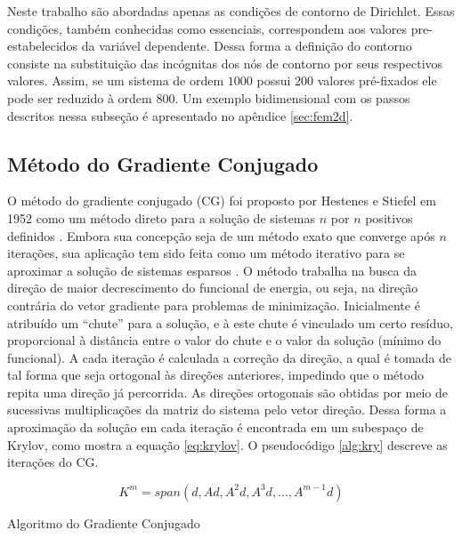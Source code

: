 \documentclass[
    12pt,               %
    openright,          %
    oneside,
    a4paper,            %
    english,            %
    french,             %
    spanish,            %
    brazil              %
    ]{abntex2}
\begin{document}
Neste trabalho são abordadas apenas as condições de contorno de Dirichlet. Essas condições, também conhecidas como essenciais, correspondem aos valores pre-estabelecidos da variável dependente. Dessa forma a definição do contorno consiste na substituição das incógnitas dos nós de contorno por seus respectivos valores. Assim, se um sistema de ordem $1000$ possui $200$ valores pré-fixados ele pode ser reduzido à ordem $800$. Um exemplo bidimensional com os passos descritos nessa subseção é apresentado no apêndice \ref{sec:fem2d}.

\subsection{Método do Gradiente Conjugado}
\label{sec:CG}
O método do gradiente conjugado (CG) foi proposto por Hestenes e Stiefel em 1952 como um método direto para a solução de sistemas $n$ por $n$ positivos definidos  \cite{burdenFaires}.
Embora sua concepção seja de um método exato que converge após $n$ iterações, sua aplicação tem sido feita como um método iterativo para se aproximar a solução de sistemas esparsos  \cite{Barrett1995}.
O método trabalha na busca da direção de maior decrescimento do funcional de energia, ou seja, na direção contrária do vetor gradiente para problemas de minimização. Inicialmente é atribuído um ``chute'' para a solução, e à este chute é vinculado um certo resíduo, proporcional à distância entre o valor do chute e o valor da solução (mínimo do funcional). A cada iteração é calculada a correção da direção, a qual é tomada de tal forma que seja ortogonal às direções anteriores, impedindo que o método repita uma direção já percorrida. As direções ortogonais são obtidas por meio de sucessivas multiplicações da matriz do sistema pelo vetor direção. Dessa forma a aproximação da solução em cada iteração é encontrada em um subespaço de Krylov, como mostra a equação \ref{eq:krylov}. O pseudocódigo \ref{alg:kry} descreve as iterações do CG.

\begin{equation}
\label{eq:krylov}
K^m = span(d, Ad, A^2d, A^3d, ..., A^{m-1}d)
\end{equation}

\begin{algorithm}	
	\caption{\label{alg:kry}Algoritmo do Gradiente Conjugado} 
	\begin{algorithmic}[1]
		\EndIf
		\EndFor
	\end{algorithmic}
\end{algorithm}
\end{document}
